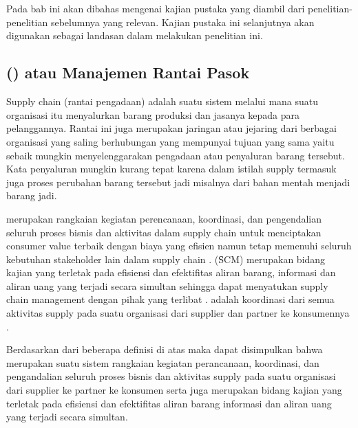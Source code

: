 \chapter{\babDua}
Pada bab ini akan dibahas mengenai kajian pustaka yang diambil dari penelitian- penelitian sebelumnya yang relevan. Kajian pustaka ini selanjutnya akan digunakan sebagai landasan dalam melakukan penelitian ini.

\section{\SCM (\scm) atau Manajemen Rantai Pasok}
Supply chain (rantai pengadaan) adalah suatu sistem melalui mana suatu organisasi itu menyalurkan barang produksi dan jasanya kepada para pelanggannya. Rantai ini juga merupakan jaringan atau jejaring dari berbagai organisasi yang saling berhubungan yang mempunyai tujuan yang sama yaitu sebaik mungkin menyelenggarakan pengadaan atau penyaluran barang tersebut. Kata penyaluran mungkin kurang tepat karena dalam istilah supply termasuk juga proses perubahan barang tersebut jadi misalnya dari bahan mentah menjadi barang jadi.\cite{Manajemen}

\scm merupakan rangkaian kegiatan perencanaan, koordinasi, dan pengendalian seluruh proses bisnis dan aktivitas dalam supply chain untuk menciptakan consumer value terbaik dengan biaya yang efisien namun tetap memenuhi seluruh kebutuhan stakeholder lain dalam supply chain \cite{Hilman2013}. \SCM (\f{SCM}) merupakan bidang kajian yang terletak pada efisiensi dan efektifitas aliran barang, informasi dan aliran uang yang terjadi secara simultan sehingga dapat menyatukan supply chain management dengan pihak yang terlibat \cite{Vistasusiyanti2017}. \SCM adalah koordinasi dari semua aktivitas supply pada suatu organisasi dari supplier dan partner ke konsumennya \cite{Hayati2015a}.

Berdasarkan dari beberapa definisi di atas maka dapat disimpulkan bahwa \scm merupakan suatu sistem rangkaian kegiatan perancanaan, koordinasi, dan pengandalian seluruh proses bisnis dan aktivitas supply pada suatu organisasi dari supplier ke partner ke konsumen serta juga merupakan bidang kajian yang terletak pada efisiensi dan efektifitas aliran barang informasi dan aliran uang yang terjadi secara simultan.



